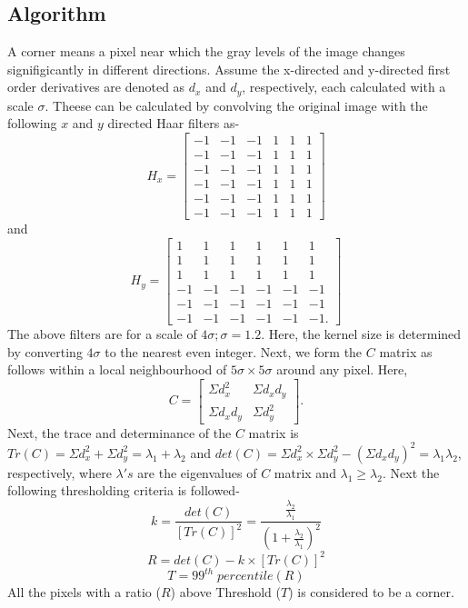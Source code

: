 \documentclass{article}
\begin{document}
\subsection{Algorithm}
A corner means a pixel near which the gray levels of the image changes signifigicantly in different directions. Assume the x-directed and y-directed first order derivatives are denoted as $d_x$ and $d_y$, respectively, each calculated with a scale $\sigma$. Theese can be calculated by convolving the original image with the following $x$ and $y$ directed Haar filters as-
\begin{equation}
H_x = \begin{bmatrix}
-1&-1&-1&1&1&1\\-1&-1&-1&1&1&1\\-1&-1&-1&1&1&1\\-1&-1&-1&1&1&1\\-1&-1&-1&1&1&1\\-1&-1&-1&1&1&1
\end{bmatrix}
\end{equation}
and
\begin{equation}
H_y = \begin{bmatrix}
1&1&1&1&1&1\\1&1&1&1&1&1\\1&1&1&1&1&1\\-1&-1&-1&-1&-1&-1\\-1&-1&-1&-1&-1&-1\\-1&-1&-1&-1&-1&-1.
\end{bmatrix}
\end{equation}
The above filters are for a scale of $4\sigma;\sigma=1.2$. Here, the kernel size is determined by converting $4\sigma$ to the nearest even integer. Next, we form the $C$ matrix as follows within a local neighbourhood of $5\sigma\times 5\sigma$ around any pixel. Here,
\begin{equation}
	C = \begin{bmatrix}
		\Sigma d_x^2 & \Sigma d_xd_y \\ \Sigma d_xd_y & \Sigma d_y^2
	\end{bmatrix}.
\end{equation}
Next, the trace and determinance of the $C$ matrix is $Tr(C) = \Sigma d_x^2 + \Sigma d_y^2 = \lambda_1 + \lambda_2$ and $det(C) = \Sigma d_x^2 \times \Sigma d_y^2 - (\Sigma d_xd_y)^2 = \lambda_1\lambda_2$, respectively, where $\lambda's$ are the eigenvalues of $C$ matrix and $\lambda_1\geq\lambda_2$. Next the following thresholding criteria is followed-
\begin{equation}
	k = \frac{det(C)}{[Tr(C)]^2} = \frac{\frac{\lambda_2}{\lambda_1}}{(1+\frac{\lambda_2}{\lambda_1})^2}
\end{equation}
\begin{equation}
	R = det(C) - k\times [Tr(C)]^2
\end{equation}
\begin{equation}
	T = 99^{th} \;percentile (R)
\end{equation}
All the pixels with a ratio ($R$) above Threshold ($T$) is considered to be a corner.
\end{document}

